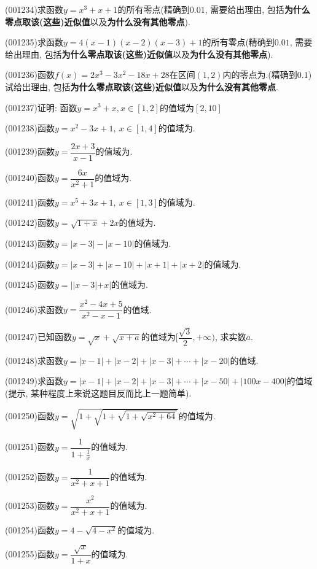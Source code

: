 \item (001234)求函数$y=x^3+x+1$的所有零点(精确到$0.01$, 需要给出理由, 包括{\bf 为什么零点取该(这些)近似值}以及{\bf 为什么没有其他零点}).
\item (001235)求函数$y=4(x-1)(x-2)(x-3)+1$的所有零点(精确到$0.01$, 需要给出理由, 包括{\bf 为什么零点取该(这些)近似值}以及{\bf 为什么没有其他零点}).
\item (001236)函数$f(x)=2x^3-3x^2-18x+28$在区间$(1,2)$内的零点为.(精确到$0.1$)\\ 
试给出理由, 包括{\bf 为什么零点取该(这些)近似值}以及{\bf 为什么没有其他零点}.
\item (001237)证明: 函数$y=x^3+x,x\in [1,2]$的值域为$[2,10]$
\item (001238)函数$y=x^2-3x+1, \ x \in [1,4]$的值域为.
\item (001239)函数$y=\dfrac{2x+3}{x-1}$的值域为.
\item (001240)函数$y=\dfrac{6x}{x^2+1}$的值域为.
\item (001241)函数$y=x^5+3x+1, \ x \in [1,3]$的值域为.
\item (001242)函数$y=\sqrt{1+x}+2x$的值域为.
\item (001243)函数$y=|x-3|-|x-10|$的值域为.
\item (001244)函数$y=|x-3|+|x-10|+|x+1|+|x+2|$的值域为.
\item (001245)函数$y=||x-3|+x|$的值域为.
\item (001246)求函数$y=\dfrac{x^2-4x+5}{x^2-x-1}$的值域.
\item (001247)已知函数$y=\sqrt{x}+\sqrt{x+a}$的值域为$[\dfrac{\sqrt{3}}{2},+\infty)$, 求实数$a$.
\item (001248)求函数$y=|x-1|+|x-2|+|x-3|+\cdots+|x-20|$的值域.
\item (001249)求函数$y=|x-1|+|x-2|+|x-3|+\cdots+|x-50|+|100x-400|$的值域(提示, 某种程度上来说这题目反而比上一题简单).
\item (001250)函数$y=\sqrt{1+\sqrt{1+\sqrt{1+\sqrt{x^2+64}}}}$的值域为.
\item (001251)函数$y=\dfrac{1}{1+\frac{1}{x}}$的值域为.
\item (001252)函数$y=\dfrac{1}{x^2+x+1}$的值域为.
\item (001253)函数$y=\dfrac{x^2}{x^2+x+1}$的值域为.
\item (001254)函数$y=4-\sqrt{4-x^2}$的值域为.
\item (001255)函数$y=\dfrac{\sqrt{x}}{1+x}$的值域为.
